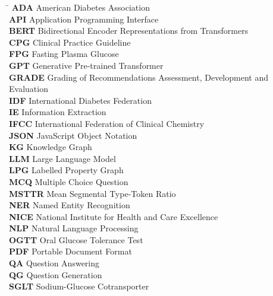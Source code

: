 
\begin{tabbing}
\hspace{3.5cm} \= \kill
\textbf{ADA}    \> American Diabetes Association \\[4pt]
\textbf{API}    \> Application Programming Interface \\[4pt]
\textbf{BERT}   \> Bidirectional Encoder Representations from Transformers \\[4pt]
\textbf{CPG}    \> Clinical Practice Guideline \\[4pt]
\textbf{FPG}    \> Fasting Plasma Glucose \\[4pt]
\textbf{GPT}    \> Generative Pre-trained Transformer \\[4pt]
\textbf{GRADE}  \> Grading of Recommendations Assessment, Development and Evaluation \\[4pt]
\textbf{IDF}    \> International Diabetes Federation \\[4pt]
\textbf{IE}     \> Information Extraction \\[4pt]
\textbf{IFCC}   \> International Federation of Clinical Chemistry \\[4pt]
\textbf{JSON}   \> JavaScript Object Notation \\[4pt]
\textbf{KG}     \> Knowledge Graph \\[4pt]
\textbf{LLM}    \> Large Language Model \\[4pt]
\textbf{LPG}    \> Labelled Property Graph \\[4pt]
\textbf{MCQ}    \> Multiple Choice Question \\[4pt]
\textbf{MSTTR}  \> Mean Segmental Type-Token Ratio \\[4pt]
\textbf{NER}    \> Named Entity Recognition \\[4pt]
\textbf{NICE}   \> National Institute for Health and Care Excellence \\[4pt]
\textbf{NLP}    \> Natural Language Processing \\[4pt]
\textbf{OGTT}   \> Oral Glucose Tolerance Test \\[4pt]
\textbf{PDF}    \> Portable Document Format \\[4pt]
\textbf{QA}     \> Question Answering \\[4pt]
\textbf{QG}     \> Question Generation \\[4pt]
\textbf{SGLT}   \> Sodium-Glucose Cotransporter \\[4pt]
\end{tabbing}